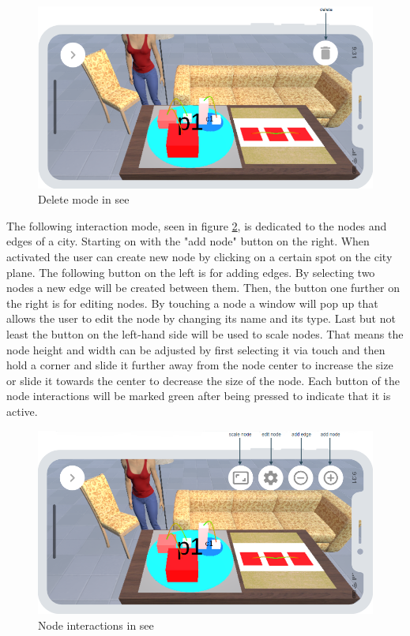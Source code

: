 \begin{figure}[htb]
    \centering
    \includegraphics[width=1\textwidth]{Concept/img/menu2.png}
    \caption{Delete mode in \gls{see}}\label{fig:delete}
\end{figure}

The following interaction mode, seen in figure \ref{fig:nodes}, is dedicated to the nodes and edges of a \gls{city}.
Starting on with the "add node" button on the right.
When activated the user can create new node by clicking on a certain spot on the \gls{city} plane. 
The following button on the left is for adding edges.
By selecting two nodes a new edge will be created between them. 
Then, the button one further on the right is for editing nodes.
By touching a node a window will pop up that allows the user to edit the node by changing its name and its type.
Last but not least the button on the left-hand side will be used to scale nodes.
That means the node height and width can be adjusted by first selecting it via touch and then hold a corner and slide it further away from the node center to increase the size or slide it towards the center to decrease the size of the node.
Each button of the node interactions will be marked green after being pressed to indicate that it is active.

\begin{figure}[htb]
    \centering
    \includegraphics[width=1\textwidth]{Concept/img/menu3.png}
    \caption{Node interactions in \gls{see}}\label{fig:nodes}
\end{figure}

